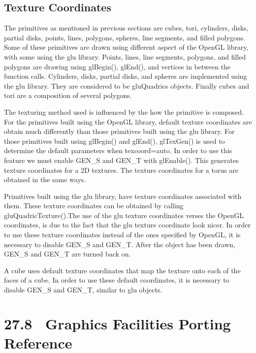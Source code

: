 \subsection{Texture Coordinates}

The primitives as mentioned in previous sections are cubes, tori,
cylinders, disks, partial disks, points, lines, polygons, spheres,
line segments, and filled polygons. Some of these primitives are drawn
using different aspect of the OpenGL library, with some using the glu
library. Points, lines, line segments, polygons, and filled polygons
are drawing using \textsf{glBegin()}, \textsf{glEnd()}, and vertices
in between the function calls. Cylinders, disks, partial disks, and
spheres are implemented using the glu library. They are considered to
be\textsf{ gluQuadrics} objects. Finally cubes and tori are a
composition of several polygons.

The texturing method used is influenced by the how the primitive is
composed. For the primitives built using the OpenGL library, default
texture coordinates are obtain much differently than those primitives
built using the glu library. For those primitives built using
\textsf{glBegin()} and \textsf{glEnd()}, \textsf{glTexGen()} is used
to determine the default parameters when
\textsf{{\textquotedbl}texcoord=auto{\textquotedbl}}. In order to use
this feature we must enable \textsf{GEN\_S} and \textsf{GEN\_T} with
\textsf{glEnable().} This generates texture coordinates for a 2D
textures. The texture coordinates for a torus are obtained in the same
ways.

Primitives built using the glu library, have texture coordinates
associated with them. These texture coordinates can be obtained by
calling \textsf{gluQuadricTexture()}.The use of the glu texture
coordinates verses the OpenGL coordinates, is due to the fact that the
glu texture coordinate look nicer. In order to use these texture
coordinates instead of the ones specified by OpenGL, it is necessary
to disable \textsf{GEN\_S} and \textsf{GEN\_T}. After the object has
been drawn, \textsf{GEN\_S} and \textsf{GEN\_T} are turned back on.

A cube uses default texture coordinates that map the texture onto each
of the faces of a cube. In order to use these default coordinates, it
is necessary to disable \textsf{GEN\_S} and \textsf{GEN\_T}, similar
to glu objects.

\section[27.8 \ Graphics Facilities Porting Reference]{27.8 \ Graphics Facilities Porting Reference}

